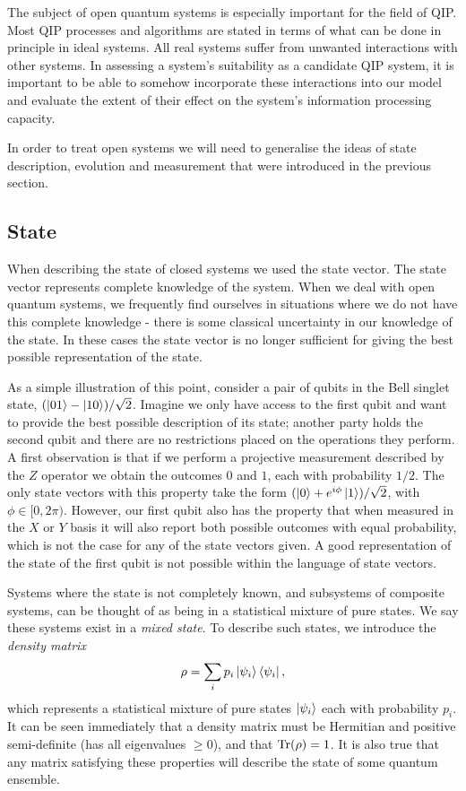The subject of open quantum systems is especially important for the field of QIP. Most QIP processes and algorithms are stated in terms of what can be done in principle in ideal systems. All real systems suffer from unwanted interactions with other systems. In assessing a system's suitability as a candidate QIP system, it is important to be able to somehow incorporate these interactions into our model and evaluate the extent of their effect on the system's information processing capacity.

In order to treat open systems we will need to generalise the ideas of state description, evolution and measurement that were introduced in the previous section.



\subsection{State}

When describing the state of closed systems we used the state vector. The state vector represents complete knowledge of the system. When we deal with open quantum systems, we frequently find ourselves in situations where we do not have this complete knowledge - there is some classical uncertainty in our knowledge of the state. In these cases the state vector is no longer sufficient for giving the best possible representation of the state. 

As a simple illustration of this point, consider a pair of qubits in the Bell singlet state, $(\left\vert01\right\rangle - \left\vert10\right\rangle)/\sqrt{2}$. Imagine we only have access to the first qubit and want to provide the best possible description of its state; another party holds the second qubit and there are no restrictions placed on the operations they perform. A first observation is that if we perform a projective measurement described by the $Z$ operator we obtain the outcomes $0$ and $1$, each with probability $1/2$. The only state vectors with this property take the form $(\left\vert0\right\rangle + e^{i\phi}\left\vert1\right\rangle)/\sqrt{2}$, with $\phi \in [0, 2\pi)$. However, our first qubit also has the property that when measured in the $X$ or $Y$ basis it will also report both possible outcomes with equal probability, which is not the case for any of the state vectors given. A good representation of the state of the first qubit is not possible within the language of state vectors.

Systems where the state is not completely known, and subsystems of composite systems, can be thought of as being in a statistical mixture of pure states. We say these systems exist in a \textit{mixed state}. To describe such states, we introduce the \textit{density matrix}
\begin{align}
  \rho = \sum_i p_i \left\vert\psi_i\right\rangle\left\langle \psi_i\right\vert,
\end{align}
which represents a statistical mixture of pure states $\left\vert\psi_i\right\rangle$ each with probability $p_i$. It can be seen immediately that a density matrix must be Hermitian and positive semi-definite (has all eigenvalues $\geq 0$), and that $\operatorname{Tr}(\rho) = 1$. It is also true that any matrix satisfying these properties will describe the state of some quantum ensemble.

